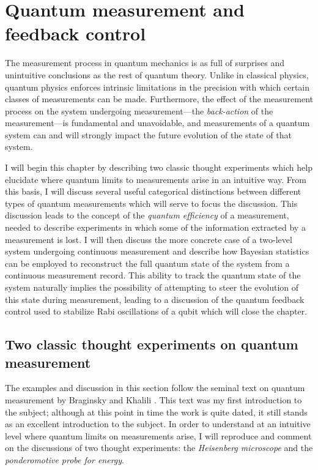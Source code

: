 
\chapter{Quantum measurement and feedback control}
\label{c:qm}

The measurement process in quantum mechanics is as full of surprises and unintuitive conclusions as the rest of quantum theory.  Unlike in classical physics, quantum physics enforces intrinsic limitations in the precision with which certain classes of measurements can be made.  Furthermore, the effect of the measurement process on the system undergoing measurement---the \textit{back-action} of the measurement---is fundamental and unavoidable, and measurements of a quantum system can and will strongly impact the future evolution of the state of that system.

I will begin this chapter by describing two classic thought experiments which help elucidate where quantum limits to measurements arise in an intuitive way.  From this basis, I will discuss several useful categorical distinctions between different types of quantum measurements which will serve to focus the discussion.  This discussion leads to the concept of the \textit{quantum efficiency} of a measurement, needed to describe experiments in which some of the information extracted by a measurement is lost.  I will then discuss the more concrete case of a two-level system undergoing continuous measurement and describe how Bayesian statistics can be employed to reconstruct the full quantum state of the system from a continuous measurement record.  This ability to track the quantum state of the system naturally implies the possibility of attempting to steer the evolution of this state during measurement, leading to a discussion of the quantum feedback control used to stabilize Rabi oscillations of a qubit which will close the chapter.

\section{Two classic thought experiments on quantum measurement}

The examples and discussion in this section follow the seminal text on quantum measurement by Braginsky and Khalili \cite{Braginsky1992}.  This text was my first introduction to the subject; although at this point in time the work is quite dated, it still stands as an excellent introduction to the subject.  In order to understand at an intuitive level where quantum limits on measurements arise, I will reproduce and comment on the discussions of two thought experiments: the \textit{Heisenberg microscope} and the \textit{ponderomotive probe for energy}.

